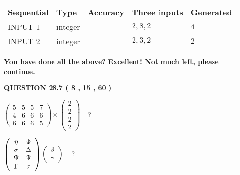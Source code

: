 \documentclass[12pt]{article}
\begin{document}
   
  
  
\noindent\begin{tabular}{|l|l|l|l|l|}
\hline
 Sequential & Type & Accuracy & Three inputs & Generated \\ 
\hline
 
 
  INPUT $            1 $ & integer &  & $
 2
 , 
 8
 , 
 2
 $ & $ 4 $ 
 \\  \hline  
 
 
  INPUT $            2 $ & integer &  & $
 2
 , 
 3
 , 
 2
 $ & $ 2 $ 
 \\  \hline  
 \end{tabular}
   
   
   
   
\vspace{0.3in}
{\textbf{\LARGE{You have done all the above? Excellent! Not much left, please continue.}}}
\vspace{0.3in}
   
   
  
\vspace{0.2in}
  
{\textbf{\Large{QUESTION
28.7 
 (           8 ,          15 ,          60 )
}}}
  
  
 
$ \left( \begin{array}{ccccccccc}
           5  & 
           5  & 
           5  & 
           7  \\ 
           4  & 
           6  & 
           6  & 
           6  \\ 
           6  & 
           6  & 
           6  & 
           5
\end{array}\right) \times
\left( \begin{array}{c}
           2  \\ 
           2  \\ 
           2  \\ 
           2
\end{array}\right) $ =?
 
 
$  %
 \left( \begin{array}
 {
 c
 c
 }
 \eta & 
 \Phi \\ 
 \sigma & 
 \Delta \\ 
 \Psi & 
 \Psi \\ 
 \Gamma & 
 \sigma
 \end{array} \right)
 \left( \begin{array}
 {
 c
 }
 \beta \\ 
 \gamma
 \end{array} \right)
$ =?
 
\end{document}
